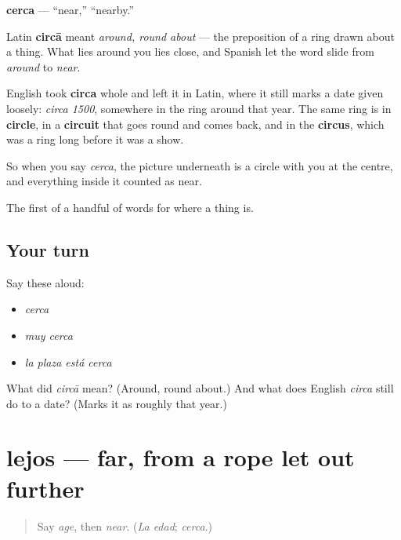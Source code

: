 \begin{cousinweb}
\textbf{cerca} — \textquotedblleft{}near,\textquotedblright{} \textquotedblleft{}nearby.\textquotedblright{}

Latin \textbf{circā} meant \emph{around, round about} — the preposition of a ring drawn about a thing. What lies around you lies close, and Spanish let the word slide from \emph{around} to \emph{near}.

English took \textbf{circa} whole and left it in Latin, where it still marks a date given loosely: \emph{circa 1500}, somewhere in the ring around that year. The same ring is in \textbf{circle}, in a \textbf{circuit} that goes round and comes back, and in the \textbf{circus}, which was a ring long before it was a show.

So when you say \emph{cerca}, the picture underneath is a circle with you at the centre, and everything inside it counted as near.
\end{cousinweb}

\begin{grammarlens}[title={What you've built}]
The first of a handful of words for where a thing is.
\end{grammarlens}

\subsection*{Your turn}
Say these aloud:

\begin{itemize}
\raggedright
  \item \emph{cerca}
  \item \emph{muy cerca}
  \item \emph{la plaza está cerca}
\end{itemize}

\begin{tcolorbox}[breakable,colback=teal!4,colframe=teal!35!black,title={Before you move on}]
What did \emph{circā} mean? (Around, round about.) And what does English \emph{circa} still do to a date? (Marks it as roughly that year.)
\end{tcolorbox}
\section[lejos]{lejos — far, from a rope let out further}

\label{lesson:ES-C340-lejos}



\begin{quote}
Say \emph{age}, then \emph{near}. (\emph{La edad}; \emph{cerca}.)
\end{quote}

